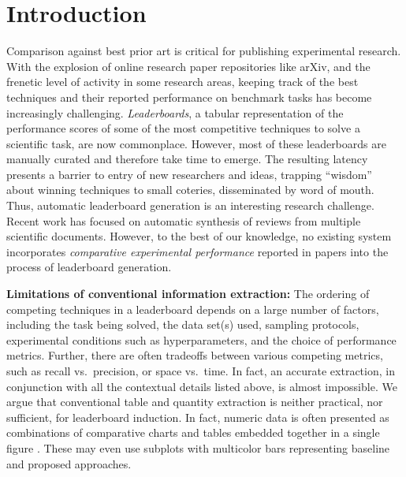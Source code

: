 \documentclass[runningheads]{llncs}
\begin{document}

\section{Introduction}
\label{sec:Intro}

Comparison against best prior art is critical for publishing experimental research.  With the explosion of online research paper repositories like arXiv, and the frenetic level of activity in some research areas, keeping track of the best techniques and their reported performance on benchmark tasks has become increasingly challenging. \textit{Leaderboards}, a tabular representation of the performance scores of some of the most competitive techniques to solve a scientific task, are now commonplace. However, most of these leaderboards are manually curated and therefore take time to emerge.  The resulting latency presents a barrier to entry of new researchers and ideas, trapping ``wisdom'' about winning techniques to small coteries, disseminated by word of mouth. Thus, automatic leaderboard generation is an interesting research challenge. Recent work \citep{hashimoto7automatic} has focused on automatic synthesis of reviews from multiple scientific documents.  However, to the best of our knowledge, no existing system incorporates \emph{comparative experimental performance} reported in papers into the process of leaderboard generation.

\noindent \textbf{Limitations of conventional information extraction:} The ordering of competing techniques in a leaderboard depends on a large number of factors, including the task being solved, the data set(s) used, sampling protocols, experimental conditions such as hyperparameters, and the choice of performance metrics.  Further, there are often tradeoffs between various competing metrics, such as recall vs.\ precision, or space vs.\ time.  In fact, an accurate extraction, in conjunction with all the contextual details listed above, is almost impossible.  We argue that conventional table and quantity extraction \citep{CafarellaHWWZ2008WebTables2, SarawagiC2014QEWT} is  neither practical, nor sufficient, for leaderboard induction.  In fact, numeric data is often presented as combinations of comparative charts and tables embedded together in a single figure \citep{SinghSVGMC2019TabCite}.  These may even use subplots with multicolor bars representing baseline and proposed approaches.
  
\end{document}
